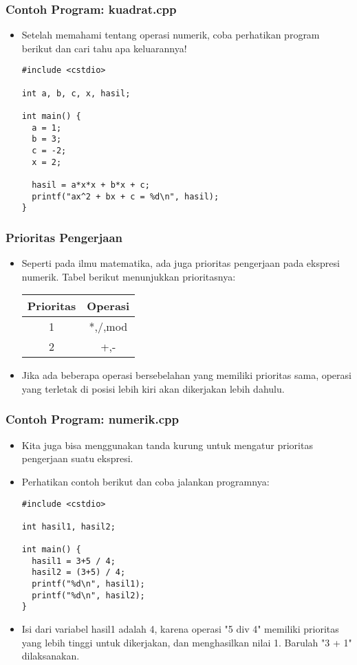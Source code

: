 \begin{frame}[fragile]
\frametitle{Contoh Program: kuadrat.cpp}
\begin{itemize}
  \item Setelah memahami tentang operasi numerik, coba perhatikan program berikut dan cari tahu apa keluarannya!
\begin{lstlisting}
#include <cstdio>

int a, b, c, x, hasil;

int main() {
  a = 1;
  b = 3;
  c = -2;
  x = 2;

  hasil = a*x*x + b*x + c;
  printf("ax^2 + bx + c = %d\n", hasil);
}\end{lstlisting}
\end{itemize}
\end{frame}

\begin{frame}
\frametitle{Prioritas Pengerjaan}
\begin{itemize}
  \item Seperti pada ilmu matematika, ada juga prioritas pengerjaan pada ekspresi numerik. Tabel berikut menunjukkan prioritasnya:

  \begin{tabular}{|c|c|}
  \hline Prioritas & Operasi \\
  \hline 1 & *,/,mod \\
  \hline 2 & +,- \\
  \hline
  \end{tabular}
  \item Jika ada beberapa operasi bersebelahan yang memiliki prioritas sama, operasi yang terletak di posisi lebih kiri akan dikerjakan lebih dahulu.
\end{itemize}
\end{frame}

\begin{frame}[fragile]
\frametitle{Contoh Program: numerik.cpp}
\begin{itemize}
  \item Kita juga bisa menggunakan tanda kurung untuk mengatur prioritas pengerjaan suatu ekspresi.
  \item Perhatikan contoh berikut dan coba jalankan programnya:
\begin{lstlisting}
#include <cstdio>

int hasil1, hasil2;

int main() {
  hasil1 = 3+5 / 4;
  hasil2 = (3+5) / 4;
  printf("%d\n", hasil1);
  printf("%d\n", hasil2);
}
\end{lstlisting}
  \item Isi dari variabel hasil1 adalah 4, karena operasi "5 div 4" memiliki prioritas yang lebih tinggi untuk dikerjakan, dan menghasilkan nilai 1. Barulah "3 + 1" dilaksanakan.
\end{itemize}
\end{frame}

